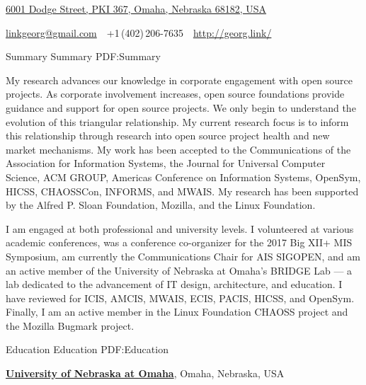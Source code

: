 \documentclass[letterpaper,MMMyyyy,nonstopmode]{simpleresumecv}
\newcommand{\CVWebpage}{http://georg.link/}
\begin{document}


\begin{SubTitle}
\href{https://www.google.com/maps/place/University+of+Nebraska+at+Omaha}
{6001 Dodge Street, PKI 367, Omaha, Nebraska 68182, USA}
\par
\href{mailto:linkgeorg@gmail.com}
{linkgeorg@gmail.com}
\,\SubBulletSymbol\,
+1\,(402)\,206-7635
\,\SubBulletSymbol\,
\href{\CVWebpage}
{\url{\CVWebpage}}
\end{SubTitle}

\begin{Body}


\Section
{Summary}
{Summary}
{PDF:Summary}

My research advances our knowledge in corporate engagement with open
source projects. As corporate involvement increases, open source foundations
provide guidance and support for open source projects. We only begin to
understand the evolution of this triangular relationship. My current research focus 
is to inform this relationship through research into open source project health 
and new market mechanisms. 
My work has been accepted to 
the Communications of the Association for Information Systems,
the Journal for Universal Computer Science,
ACM GROUP, 
Americas Conference on Information Systems,
OpenSym,
HICSS, 
CHAOSSCon,
INFORMS,
and MWAIS.
My research has been supported by the Alfred P. Sloan Foundation, Mozilla, and the Linux Foundation.


\BigGap
I am engaged at both professional and university levels. I volunteered 
at various academic conferences, was a conference co-organizer for the 
2017 Big XII+ MIS Symposium, am currently the Communications Chair for AIS SIGOPEN, 
and am an active member of the University of Nebraska at Omaha's BRIDGE Lab ---
a lab dedicated to the advancement of IT design, architecture, and education. 
I have reviewed for ICIS, AMCIS, MWAIS, ECIS, PACIS, HICSS, and OpenSym.
Finally, I am an active member in the Linux Foundation CHAOSS project and 
the Mozilla Bugmark project.



\Section
{Education}
{Education}
{PDF:Education}

\Entry
\href{http://unomaha.edu/}
{\textbf{University of Nebraska at Omaha}},
Omaha, Nebraska, USA


\end{Body}
\end{document}
